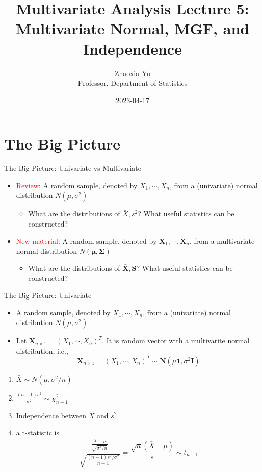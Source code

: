 \documentclass[
  ignorenonframetext,
]{beamer}
\title{Multivariate Analysis Lecture 5: Multivariate Normal, MGF, and
Independence}
\author{Zhaoxia Yu\\
Professor, Department of Statistics}
\date{2023-04-17}
\providecommand{\tightlist}{%
  \setlength{\itemsep}{0pt}\setlength{\parskip}{0pt}}
\begin{document}
\frame{\titlepage}

\hypertarget{the-big-picture}{%
\section{The Big Picture}\label{the-big-picture}}

\begin{frame}{The Big Picture: Univariate vs Multivariate}
\protect\hypertarget{the-big-picture-univariate-vs-multivariate}{}
\begin{itemize}
\tightlist
\item
  \textcolor{red}{Review}: A random sample, denoted by
  \(X_1, \cdots, X_n\), from a (univariate) normal distribution
  \(N(\mu, \sigma^2)\)

  \begin{itemize}
  \tightlist
  \item
    What are the distributions of \(\bar X, s^2\)? What useful
    statistics can be constructed?
  \end{itemize}
\item
  \textcolor{red}{New material}: A random sample, denoted by
  \(\mathbf X_1, \cdots, \mathbf X_n\), from a multivariate normal
  distribution \(N(\boldsymbol \mu, \boldsymbol \Sigma)\)

  \begin{itemize}
  \tightlist
  \item
    What are the distributions of \(\bar{\mathbf X}, \mathbf S\)? What
    useful statistics can be constructed?
  \end{itemize}
\end{itemize}
\end{frame}

\begin{frame}{The Big Picture: Univariate}
\protect\hypertarget{the-big-picture-univariate}{}
\begin{itemize}
\tightlist
\item
  A random sample, denoted by \(X_1, \cdots, X_n\), from a (univariate)
  normal distribution \(N(\mu, \sigma^2)\)
\item
  Let \(\mathbf X_{n\times 1}=(X_1, \cdots, X_n)^T\). It is random
  vector with a multivarite normal distribution, i.e.,
  \[\mathbf X_{n\times 1}=(X_1, \cdots, X_n)^T \sim \mathbf N(\mu\mathbf 1, \sigma^2\mathbf I)\]
\end{itemize}

\begin{enumerate}
\tightlist
\item
  \(\bar X \sim N(\mu, \sigma^2/n)\)
\item
  \(\frac{(n-1)s^2}{\sigma^2} \sim \chi_{n-1}^2\)
\item
  Independence between \(\bar X\) and \(s^2\).
\item
  a t-statistic is
  \[\frac{\frac{\bar X-\mu}{\sqrt{\sigma^2/n}}}{\sqrt{\frac{(n-1)s^2/\sigma^2}{n-1}}}=\frac{\sqrt{n}(\bar X-\mu)}{s} \sim t_{n-1}\]
\end{enumerate}
\end{frame}
\end{document}
